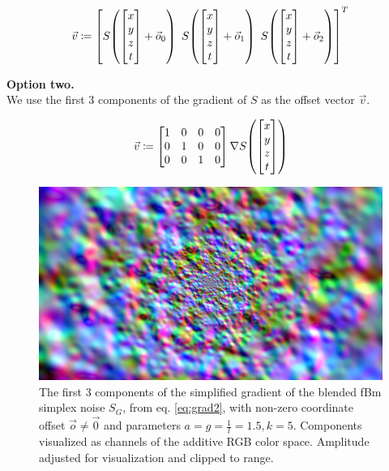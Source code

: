 \begin{equation}
    \vec{v} \coloneqq \mleft[ S\mleft(\begin{bmatrix}x\\y\\z\\t\end{bmatrix} + \vec{o}_0\mright) \enspace S\mleft(\begin{bmatrix}x\\y\\z\\t\end{bmatrix} + \vec{o}_1\mright) \enspace S\mleft(\begin{bmatrix}x\\y\\z\\t\end{bmatrix} + \vec{o}_2\mright) \mright]^T
\end{equation}

\textbf{Option two.}\\We use the first 3 components of the gradient of $S$ as the offset vector $\vec{v}$.

\begin{equation}
    \vec{v} \coloneqq \begin{bmatrix}1&0&0&0\\0&1&0&0\\0&0&1&0\end{bmatrix} \nabla S\mleft(\begin{bmatrix}x\\y\\z\\t\end{bmatrix}\mright)
\end{equation}

\begin{figure}[htb]
    \centering
    \ifgraphics
        \includegraphics[width=\linewidth]{img/noise-grad-original.png}%
    \fi
    \caption{The first 3 components of the simplified gradient of the blended \ac{fBm} simplex noise $S_G$, from eq. \ref{eq:grad2}, with non-zero coordinate offset $\vec{o} \ne \vec{0}$ and parameters $a = g = \frac{1}{l} = 1.5, k = 5$. Components visualized as channels of the additive RGB color space. Amplitude adjusted for visualization and clipped to range.}
    \label{fig:noise-grad-original}
\end{figure}

